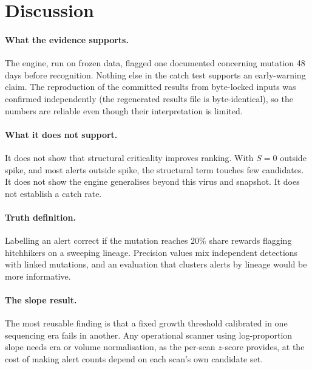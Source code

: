 \documentclass[11pt]{article}
\begin{document}
\section{Discussion}
\paragraph{What the evidence supports.} The engine, run on frozen data, flagged one documented concerning mutation 48 days before recognition. Nothing else in the catch test supports an early-warning claim. The reproduction of the committed results from byte-locked inputs was confirmed independently (the regenerated results file is byte-identical), so the numbers are reliable even though their interpretation is limited.

\paragraph{What it does not support.} It does not show that structural criticality improves ranking. With $S=0$ outside spike, and most alerts outside spike, the structural term touches few candidates. It does not show the engine generalises beyond this virus and snapshot. It does not establish a catch rate.

\paragraph{Truth definition.} Labelling an alert correct if the mutation reaches 20\% share rewards flagging hitchhikers on a sweeping lineage. Precision values mix independent detections with linked mutations, and an evaluation that clusters alerts by lineage would be more informative.

\paragraph{The slope result.} The most reusable finding is that a fixed growth threshold calibrated in one sequencing era fails in another. Any operational scanner using log-proportion slope needs era or volume normalisation, as the per-scan $z$-score provides, at the cost of making alert counts depend on each scan's own candidate set.
\end{document}
